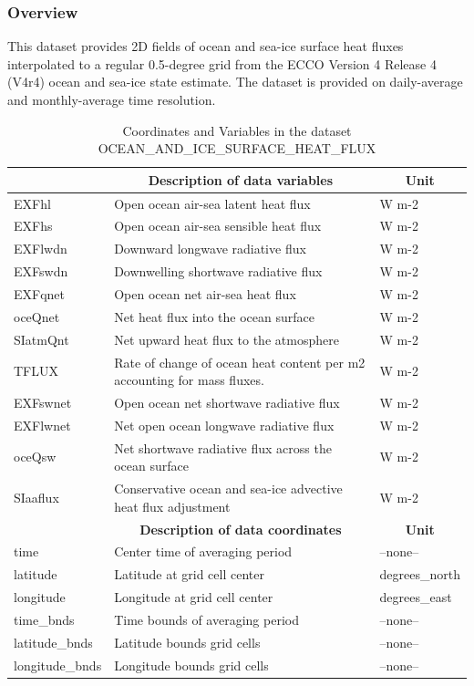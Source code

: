 \subsubsection{Overview}
This dataset provides 2D fields of ocean and sea-ice surface heat fluxes interpolated to a regular 0.5-degree grid from the ECCO Version 4 Release 4 (V4r4) ocean and sea-ice state estimate. The dataset is provided on daily-average and monthly-average time resolution. 
\begin{longtable}{|m{}|m{}|m{}|}
\caption{Coordinates and Variables in the dataset OCEAN\_AND\_ICE\_SURFACE\_HEAT\_FLUX}
\label{tab:table-OCEAN_AND_ICE_SURFACE_HEAT_FLUX-fields} \\ 
\hline \endhead \hline \endfoot
\rowcolor{lightgray} \multicolumn{1}{|c|}{\textbf{Variables}} & \multicolumn{1}{|c|}{\textbf{Description of data variables}} &  \multicolumn{1}{|c|}{\textbf{Unit}}\\ \hline
EXFhl &Open ocean air-sea latent heat flux &W m-2  \\ \hline
EXFhs &Open ocean air-sea sensible heat flux &W m-2  \\ \hline
EXFlwdn &Downward longwave radiative flux &W m-2  \\ \hline
EXFswdn &Downwelling shortwave radiative flux &W m-2  \\ \hline
EXFqnet &Open ocean net air-sea heat flux &W m-2  \\ \hline
oceQnet &Net heat flux into the ocean surface &W m-2  \\ \hline
SIatmQnt &Net upward heat flux to the atmosphere &W m-2  \\ \hline
TFLUX &Rate of change of ocean heat content per m2 accounting for mass fluxes. &W m-2  \\ \hline
EXFswnet &Open ocean net shortwave radiative flux &W m-2  \\ \hline
EXFlwnet &Net open ocean longwave radiative flux &W m-2  \\ \hline
oceQsw &Net shortwave radiative flux across the ocean surface &W m-2  \\ \hline
SIaaflux &Conservative ocean and sea-ice advective heat flux adjustment &W m-2  \\ \hline
\rowcolor{lightgray} \multicolumn{1}{|c|}{\textbf{Coordinates}} & \multicolumn{1}{|c|}{\textbf{Description of data coordinates}} &  \multicolumn{1}{|c|}{\textbf{Unit}}\\ \hline
time &Center time of averaging period &--none--  \\ \hline
latitude &Latitude at grid cell center &degrees\_north  \\ \hline
longitude &Longitude at grid cell center &degrees\_east  \\ \hline
time\_bnds &Time bounds of averaging period &--none--  \\ \hline
latitude\_bnds &Latitude bounds grid cells &--none--  \\ \hline
longitude\_bnds &Longitude bounds grid cells &--none--  \\ \hline
\end{longtable}

